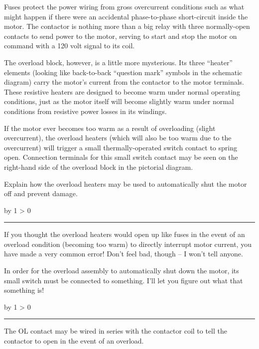 \documentclass[12pt,a4paper]{article}
\def\svar{
           \advance\answnum by 1
           \ifnum \answnum > 0
                \hrule
                \vskip 3pt
                \leftline{Svar \the\answnum}
                \vskip 3pt \fi}
\def\notes{
           \advance\explnum by 1
           \ifnum \explnum > 0
                \hrule
                \vskip 3pt
                \leftline{Notes \the\explnum}
                \vskip 3pt \fi}
\begin{document}
Fuses protect the power wiring from gross overcurrent conditions such as what might happen if there were an accidental phase-to-phase short-circuit inside the motor.  The contactor is nothing more than a big relay with three normally-open contacts to send power to the motor, serving to start and stop the motor on command with a 120 volt signal to its coil.  

\vskip 10pt

The overload block, however, is a little more mysterious.  Its three ``heater'' elements (looking like back-to-back ``question mark'' symbols in the schematic diagram) carry the motor's current from the contactor to the motor terminals.  These resistive heaters are designed to become warm under normal operating conditions, just as the motor itself will become slightly warm under normal conditions from resistive power losses in its windings.

If the motor ever becomes too warm as a result of overloading (slight overcurrent), the overload heaters (which will also be too warm due to the overcurrent) will trigger a small thermally-operated switch contact to spring open.  Connection terminals for this small switch contact may be seen on the right-hand side of the overload block in the pictorial diagram.

\vskip 10pt

Explain how the overload heaters may be used to automatically shut the motor off and prevent damage.

\vskip 10pt \filbreak 





\svar{} 

If you thought the overload heaters would open up like fuses in the event of an overload condition (becoming too warm) to directly interrupt motor current, you have made a very common error!  Don't feel bad, though -- I won't tell anyone.

In order for the overload assembly to automatically shut down the motor, its small switch must be connected to something.  I'll let you figure out what that something is!

\vskip 10pt \filbreak 





\notes{} 

The OL contact may be wired in series with the contactor coil to tell the contactor to open in the event of an overload.
\end{document}
